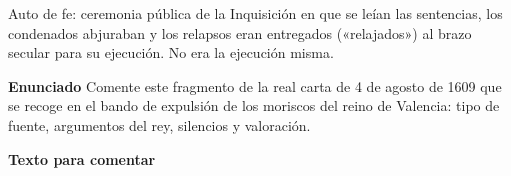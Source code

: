 \documentclass{book}
\begin{document}
\begin{tcolorbox}[title={Definición}, studiumdef, breakable]

Auto de fe: ceremonia pública de la Inquisición en que se leían las sentencias, los condenados abjuraban y los relapsos eran entregados («relajados») al brazo secular para su ejecución. No era la ejecución misma.

\end{tcolorbox}

\begin{tcolorbox}[title={Ejercicio resuelto}, studiumworked, breakable]

\noindent\textbf{Enunciado}
Comente este fragmento de la real carta de 4 de agosto de 1609 que se recoge en el bando de expulsión de los moriscos del reino de Valencia: tipo de fuente, argumentos del rey, silencios y valoración.


\noindent\textbf{Texto para comentar}


\end{tcolorbox}
\end{document}

